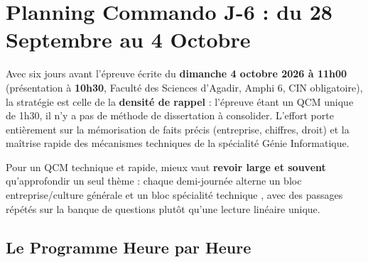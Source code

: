 \chapter{Planning Commando J-6 : du 28 Septembre au 4 Octobre}

Avec six jours avant l'épreuve écrite du \textbf{dimanche 4 octobre 2026 à 11h00} (présentation à \textbf{10h30}, Faculté des Sciences d'Agadir, Amphi 6, CIN obligatoire), la stratégie est celle de la \textbf{densité de rappel} : l'épreuve étant un QCM unique de 1h30, il n'y a pas de méthode de dissertation à consolider. L'effort porte entièrement sur la mémorisation de faits précis (entreprise, chiffres, droit) et la maîtrise rapide des mécanismes techniques de la spécialité Génie Informatique.

\begin{tcolorbox}[colback=blue!5!white,colframe=blue!75!black,title=\textbf{Principe directeur du sprint}]
Pour un QCM technique et rapide, mieux vaut \textbf{revoir large et souvent} qu'approfondir un seul thème : chaque demi-journée alterne un bloc \og entreprise/culture générale \fg{} et un bloc \og spécialité technique \fg{}, avec des passages répétés sur la banque de questions plutôt qu'une lecture linéaire unique.
\end{tcolorbox}

\section{Le Programme Heure par Heure}

